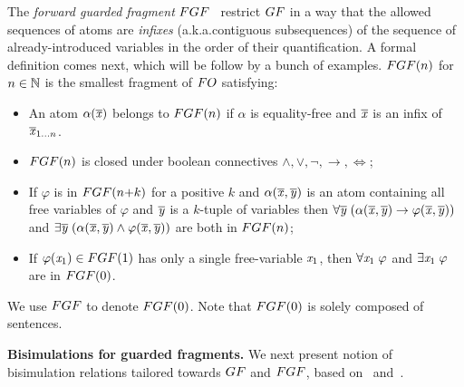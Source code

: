 \documentclass[a4paper, UKenglish, cleveref, numberwithinsect, autoref]{lipics-v2021}
\begin{document}
\begin{example}
\end{example}

The \emph{forward guarded fragment} $\FGF$~\cite{Bednarczyk21} restrict $\GF$ in a way that the allowed sequences of atoms are \emph{infixes} (a.k.a.\@ contiguous subsequences) of the sequence of already-introduced variables in the order of their quantification.
A formal definition comes next, which will be follow by a bunch of examples.
$\FGF(n)$ for $n \in {\mathbb{N}}$ is the smallest fragment of $\FO$ satisfying:
\begin{itemize}\itemsep0em
    \item An atom $\alpha(\overline{\mathit{x}})$ belongs to $\FGF(n)$ if $\alpha$ is equality-free and $\overline{\mathit{x}}$ is an infix of $\overline{\mathit{x}}_{1\ldots n}$.
    \item $\FGF(n)$ is closed under boolean connectives $\land, \lor, \neg, \to, \iff$;
    \item If $\varphi$ is in $\FGF(n{+}k)$ for a positive $k$ and $\alpha(\overline{\mathit{x}}, \overline{\mathit{y}})$ is an atom containing all free variables of $\varphi$ and $\overline{\mathit{y}}$ is a $k$-tuple of variables then  $\forall{\overline{\mathit{y}}} \; (\alpha(\overline{\mathit{x}}, \overline{\mathit{y}}) \to \varphi(\overline{\mathit{x}}, \overline{\mathit{y}}))$ and $\exists{\overline{\mathit{y}}} \; (\alpha(\overline{\mathit{x}}, \overline{\mathit{y}}) \land \varphi(\overline{\mathit{x}}, \overline{\mathit{y}}))$ are both in $\FGF(n)$; 
    \item If $\varphi(\varx_1) \in \FGF(1)$ has only a single free-variable $\mathit{x}_1$, then $\forall{\mathit{x}_1}\; \varphi$ and $\exists{\mathit{x}_1}\; \varphi$ are in $\FGF(0)$.
\end{itemize}
We use $\FGF$ to denote $\FGF(0)$. 
Note that $\FGF(0)$ is solely composed of sentences. 

\begin{example}
\end{example}


\noindent \textbf{Bisimulations for guarded fragments.}
%
We next present notion of bisimulation relations tailored towards $\GF$ and $\FGF$, based on~\cite[Sec. 2.2.3]{Otto04} and~\cite[Sec. 2]{BednarczykJ22}.
\end{document}
